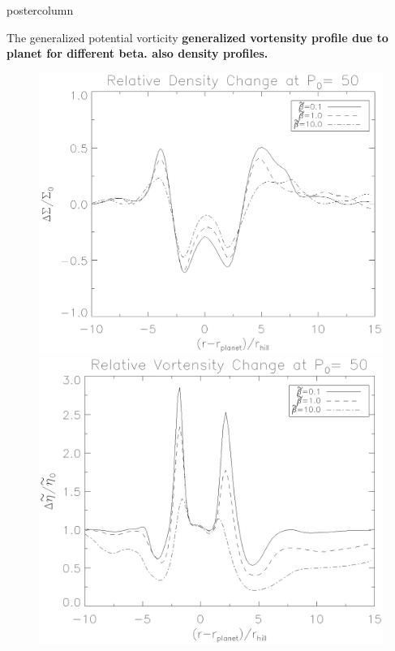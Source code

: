 \documentclass[final,hyperref={pdfpagelabels=false}]{beamer}
\begin{document}
\begin{frame}
\begin{columns}
\begin{column}{.49\textwidth}
\begin{beamercolorbox}[center,wd=\textwidth]{postercolumn}
\begin{minipage}[T]{.95\textwidth}
{            \begin{block}{{\Large The generalized potential vorticity}}
              \justifying
                  {\bf generalized vortensity profile due to planet for
                    different beta. also density profiles.}

                  \begin{figure}
                    \centering
                    \hfill
                    \begin{minipage}{0.49\textwidth}
                      \includegraphics[width=\textwidth]{Posterfig_Density}
                    \end{minipage}
                    \hfill
                    \begin{minipage}{0.49\textwidth}
                      \includegraphics[width=\textwidth]{Posterfig_Vortensity}
                    \end{minipage}
                    \hfill
                  \end{figure}


\end{block}}
\end{minipage}
\end{beamercolorbox}
\end{column}
\end{columns}
\end{frame}
\end{document}

